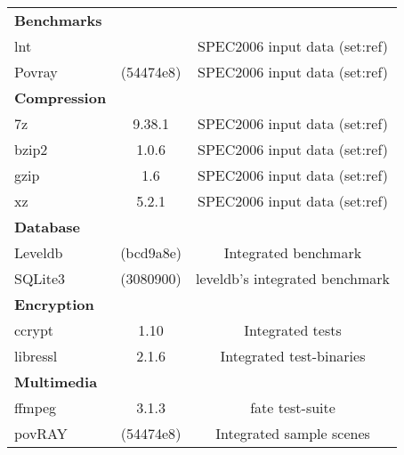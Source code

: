 \begin{longtable}{lcC} \toprule
         &  & \\
    \midrule
    \textbf{Benchmarks}\\
    lnt                      &    & SPEC2006 input data (set:ref)\\
    Povray                   & (54474e8)               & SPEC2006 input data (set:ref)\\
    \midrule
    \textbf{Compression}\\
    7z                       & 9.38.1                  & SPEC2006 input data (set:ref)\\
    bzip2                    & 1.0.6                   & SPEC2006 input data (set:ref)\\
    gzip                     & 1.6                     & SPEC2006 input data (set:ref)\\
    xz                       & 5.2.1                   & SPEC2006 input data (set:ref)\\
    \midrule
    \textbf{Database}\\
    Leveldb                  & (bcd9a8e)               & Integrated benchmark\\
    SQLite3                  & (3080900)               & leveldb's integrated benchmark\\
    \midrule
    \textbf{Encryption}\\
    ccrypt                   & 1.10                    & Integrated tests\\
    libressl                 & 2.1.6                   & Integrated test-binaries\\
    \midrule
    \textbf{Multimedia}\\
    ffmpeg                   & 3.1.3                   & fate test-suite\\
    povRAY                   & (54474e8)               & Integrated sample scenes\\

\end{longtable}
